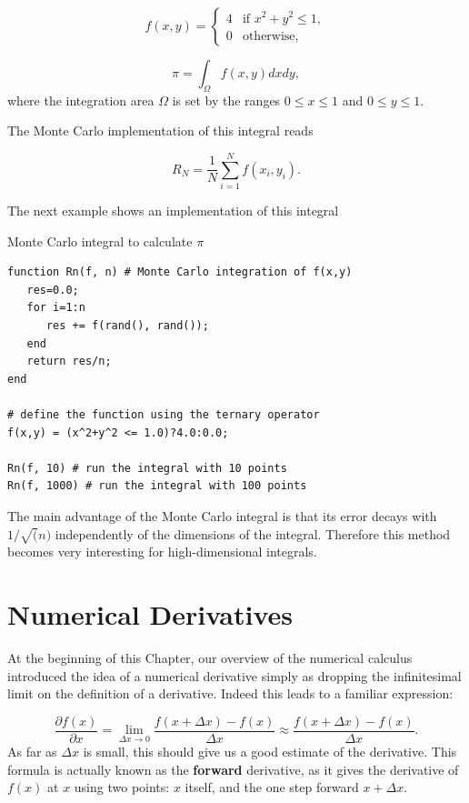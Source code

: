 \begin{equation}
 f(x,y) =
   \begin{cases} 
   4  & \text{if } x^2+y^2 \leq 1, \\
   0  & \text{otherwise,}
  \end{cases}
\end{equation}

\begin{equation}
 \pi = \int_\Omega f(x,y) dx dy,
\end{equation}
where the integration area $\Omega$ is set by the ranges $0 \leq x \leq 1$ and $0 \leq y \leq 1$.

The Monte Carlo implementation of this integral reads

\begin{equation}
 R_N = \dfrac{1}{N} \sum_{i=1}^N f(x_i, y_i).
\end{equation}

The next example shows an implementation of this integral

\begin{example}{Monte Carlo integral to calculate $\pi$}
\label{ex:montecarlopi}
\begin{verbatim}
function Rn(f, n) # Monte Carlo integration of f(x,y)
   res=0.0;
   for i=1:n
      res += f(rand(), rand());
   end
   return res/n;
end

# define the function using the ternary operator
f(x,y) = (x^2+y^2 <= 1.0)?4.0:0.0;

Rn(f, 10) # run the integral with 10 points
Rn(f, 1000) # run the integral with 100 points
\end{verbatim}
\end{example}

The main advantage of the Monte Carlo integral is that its error decays with $1/\sqrt(n)$ independently of the dimensions of the integral. Therefore this method becomes very interesting for high-dimensional integrals.

\section{Numerical Derivatives}

At the beginning of this Chapter, our overview of the numerical calculus introduced the idea of a numerical derivative simply as dropping the infinitesimal limit on the definition of a derivative. Indeed this leads to a familiar expression:

\begin{equation}
 \dfrac{\partial f(x)}{\partial x} = \lim_{\Delta x \rightarrow 0} \dfrac{f(x+\Delta x) - f(x)}{\Delta x} \approx \dfrac{f(x+\Delta x) - f(x)}{\Delta x}.
\end{equation}
As far as $\Delta x$ is small, this should give us a good estimate of the derivative. This formula is actually known as the \textbf{forward} derivative, as it gives the derivative of $f(x)$ at $x$ using two points: $x$ itself, and the one step forward $x+\Delta x$.

